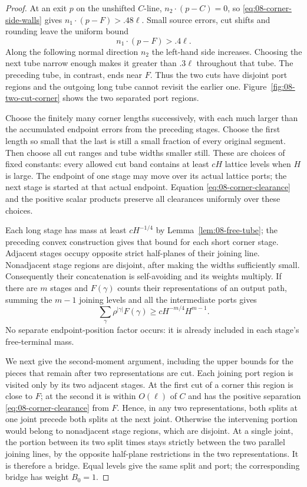 \begin{proof}
At an exit $p$ on the unshifted $C$-line,
$n_2\cdot(p-C)=0$, so \eqref{eq:08-corner-side-walls} gives
$n_1\cdot(p-F)>.48\ell$. Small source errors, cut shifts and rounding
leave the uniform bound
\begin{equation}\label{eq:08-corner-clearance}
 n_1\cdot(p-F)>.4\ell.
\end{equation}
Along the following normal direction $n_2$ the left-hand side increases.
Choosing the next tube narrow enough makes it greater than $.3\ell$
throughout that tube. The preceding tube, in contrast, ends near $F$.
Thus the two cuts have disjoint port regions and the outgoing long tube
cannot revisit the earlier one. Figure~\ref{fig:08-two-cut-corner}
shows the two separated port regions.



Choose the finitely many corner lengths successively, with each much
larger than the accumulated endpoint errors from the preceding stages.
Choose the first length so small that the last is still a small fraction
of every original segment. Then choose all cut ranges and tube widths
smaller still. These are choices of fixed constants: every allowed
cut band contains at least $cH$ lattice levels when $H$ is large.
The endpoint of one stage may move over its actual lattice ports; the
next stage is started at that actual endpoint. Equation
\eqref{eq:08-corner-clearance} and the positive scalar products preserve
all clearances uniformly over these choices.

Each long stage has mass at least $cH^{-1/4}$ by
Lemma~\ref{lem:08-free-tube}; the preceding convex construction gives
that bound for each short corner stage. Adjacent stages occupy opposite
strict half-planes of their joining line. Nonadjacent stage regions are
disjoint, after making the widths sufficiently small. Consequently their
concatenation is self-avoiding and its weights multiply. If there are
$m$ stages and $F(\gamma)$ counts their representations of an output
path, summing the $m-1$ joining levels and all the intermediate ports gives
\begin{equation}\label{eq:08-corridor-first}
 \sum_\gamma \rho^{|\gamma|}F(\gamma)
 \ge cH^{-m/4}H^{m-1}.
\end{equation}
No separate endpoint-position factor occurs: it is already included in
each stage's free-terminal mass.

We next give the second-moment argument, including the upper bounds for
the pieces that remain after two representations are cut. Each joining
port region is visited only by its two adjacent stages. At the first
cut of a corner this region is close to $F$; at the second it is within
$O(\ell)$ of $C$ and has the positive separation
\eqref{eq:08-corner-clearance} from $F$. Hence, in any two
representations, both splits at one joint precede both splits at the
next joint. Otherwise the intervening portion would belong to
nonadjacent stage regions, which are disjoint. At a single joint, the
portion between its two split times stays strictly between the two
parallel joining lines, by the opposite half-plane restrictions in the
two representations. It is therefore a bridge. Equal levels give the
same split and port; the corresponding bridge has weight $B_0=1$.


\end{proof}
